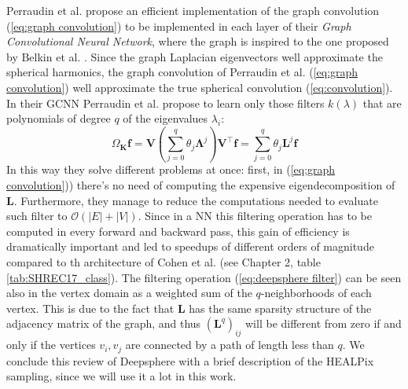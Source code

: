 Perraudin et al. propose an efficient implementation of the graph convolution (\ref{eq:graph convolution}) to be implemented in each layer of their \textit{Graph Convolutional Neural Network}, where the graph is inspired to the one proposed by Belkin et al. \cite{Belkin:2005:TTF:2138147.2138189}. Since the graph Laplacian eigenvectors well approximate the spherical harmonics, the graph convolution of Perraudin et al. (\ref{eq:graph convolution}) well approximate the true spherical convolution (\ref{eq:convolution}). In their GCNN Perraudin et al. propose to learn only those filters $k(\lambda)$ that are polynomials of degree $q$ of the eigenvalues $\lambda_i$:
\begin{equation}\label{eq:deepsphere filter}
\Omega_\mathbf K \mathbf f = \boldsymbol{V}\left(\sum_{j=0}^{q} \theta_{j} \boldsymbol{\Lambda}^{j}\right) \boldsymbol{V}^{\top} \boldsymbol{f}=\sum_{j=0}^{q} \theta_{j} \boldsymbol{L}^{j} \boldsymbol{f}
\end{equation}
In this way they solve different problems at once: first, in (\ref{eq:graph convolution})) there's no need of computing the expensive eigendecomposition of $\mathbf L$. Furthermore, they manage to reduce the computations needed to evaluate such filter to $\mathcal O(|E|+|V|)$. Since in a NN this filtering operation has to be computed in every forward and backward pass, this gain of efficiency is dramatically important and led to speedups of different orders of magnitude compared to th architecture of Cohen et al. (see Chapter 2, table \ref{tab:SHREC17_class}). The filtering operation (\ref{eq:deepsphere filter}) can be seen also in the vertex domain as a weighted sum of the $q$-neighborhoods of each vertex. This is due to the fact that $\mathbf L $ has the same sparsity structure of the adjacency matrix of the graph, and thus $(\mathbf L^q)_{ij}$ will be different from zero if and only if the vertices $v_i, v_j$ are connected by a path of length less than $q$. We conclude this review of Deepsphere with a brief description of the HEALPix sampling, since we will use it a lot in this work.


